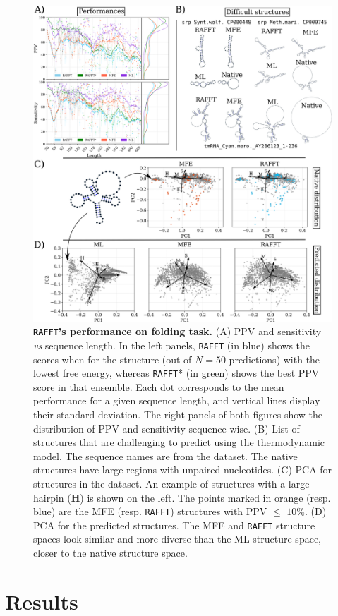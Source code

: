 \begin{figure}[t!]
	\centering
	\includegraphics[width=.9\linewidth]{../res/images/rafft/perf_illed.png}
	\caption{\label{perf_fig} \textbf{\texttt{RAFFT}'s performance on folding task.} (A) PPV and sensitivity \emph{vs} sequence length. In the left panels, \texttt{RAFFT} (in blue) shows the scores when for the structure (out of $N=50$ predictions) with the lowest free energy, whereas \texttt{RAFFT}* (in green) shows the best PPV score in that ensemble. Each dot corresponds to the mean performance for a given sequence length, and vertical lines display their standard deviation. The right panels of both figures show the distribution of PPV and sensitivity sequence-wise. (B) List of structures that are challenging to predict using the thermodynamic model. The sequence names are from the dataset. The native structures have large regions with unpaired nucleotides. (C) PCA for structures in the dataset. An example of structures with a large hairpin (\textbf{H}) is shown on the left. The points marked in orange (resp. blue) are the MFE (resp. \texttt{RAFFT}) structures with PPV \(\leq\) \(10\%\). (D) PCA for the predicted structures. The MFE and \texttt{RAFFT} structure spaces look similar and more diverse than the ML structure space, closer to the native structure space.}
\end{figure}

\section*{Results}

